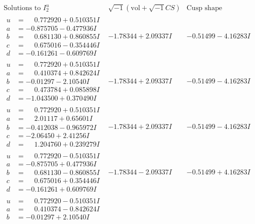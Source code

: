 \documentclass[1p]{elsarticle_modified}
\theoremstyle{definition}
\newcommand{\I}{\sqrt{-1}}
\begin{document}
$$\begin{array}{c|c|c}  
\text{Solutions to }I^u_{2}& \I (\text{vol} + \sqrt{-1}CS) & \text{Cusp shape}\\
 \hline 
\begin{aligned}
u &= \phantom{-}0.772920 + 0.510351 I \\
a &= -0.875705 - 0.477936 I \\
b &= \phantom{-}0.681130 + 0.860855 I \\
c &= \phantom{-}0.675016 - 0.354446 I \\
d &= -0.161261 - 0.609769 I\end{aligned}
 & -1.78344 + 2.09337 I & -0.51499 - 4.16283 I \\ \hline\begin{aligned}
u &= \phantom{-}0.772920 + 0.510351 I \\
a &= \phantom{-}0.410374 + 0.842624 I \\
b &= -0.01297 - 2.10540 I \\
c &= \phantom{-}0.473784 + 0.085898 I \\
d &= -1.043500 + 0.370490 I\end{aligned}
 & -1.78344 + 2.09337 I & -0.51499 - 4.16283 I \\ \hline\begin{aligned}
u &= \phantom{-}0.772920 + 0.510351 I \\
a &= \phantom{-}2.01117 + 0.65601 I \\
b &= -0.412038 - 0.965972 I \\
c &= -2.06450 + 2.41256 I \\
d &= \phantom{-}1.204760 + 0.239279 I\end{aligned}
 & -1.78344 + 2.09337 I & -0.51499 - 4.16283 I \\ \hline\begin{aligned}
u &= \phantom{-}0.772920 - 0.510351 I \\
a &= -0.875705 + 0.477936 I \\
b &= \phantom{-}0.681130 - 0.860855 I \\
c &= \phantom{-}0.675016 + 0.354446 I \\
d &= -0.161261 + 0.609769 I\end{aligned}
 & -1.78344 - 2.09337 I & -0.51499 + 4.16283 I \\ \hline\begin{aligned}
u &= \phantom{-}0.772920 - 0.510351 I \\
a &= \phantom{-}0.410374 - 0.842624 I \\
b &= -0.01297 + 2.10540 I \\

\end{aligned}
\end{array}$$
\end{document}
